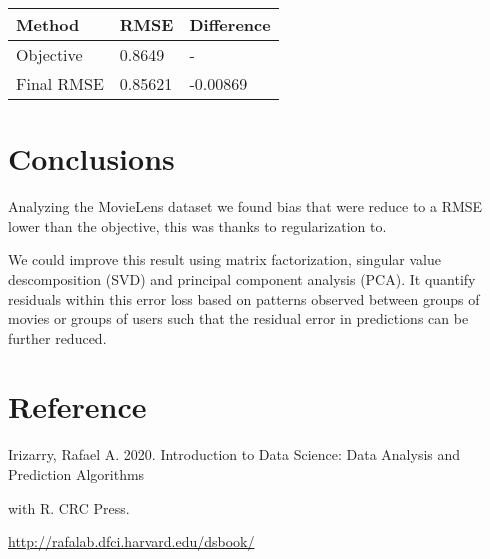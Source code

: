\documentclass[
]{article}
\begin{document}
\begin{longtable}[]{@{}lll@{}}
\toprule\noalign{}
Method & RMSE & Difference \\
\midrule\noalign{}
\endhead
\bottomrule\noalign{}
\endlastfoot
Objective & 0.8649 & - \\
Final RMSE & 0.85621 & -0.00869 \\
\end{longtable}

\hypertarget{conclusions}{%
\section{Conclusions}\label{conclusions}}

Analyzing the MovieLens dataset we found bias that were reduce to a RMSE
lower than the objective, this was thanks to regularization to.

We could improve this result using matrix factorization, singular value
descomposition (SVD) and principal component analysis (PCA). It quantify
residuals within this error loss based on patterns observed between
groups of movies or groups of users such that the residual error in
predictions can be further reduced.

\hypertarget{reference}{%
\section{Reference}\label{reference}}

Irizarry, Rafael A. 2020. Introduction to Data Science: Data Analysis
and Prediction Algorithms

with R. CRC Press.

\url{http://rafalab.dfci.harvard.edu/dsbook/}
\end{document}
